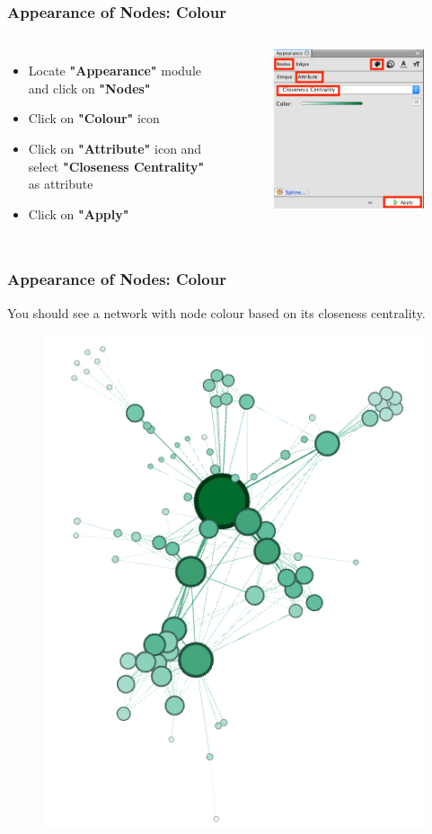 \documentclass[10pt]{beamer}
\begin{document}
\begin{frame}
\frametitle{Appearance of Nodes: Colour}

\begin{columns}[c] 
\begin{itemize}
\item Locate \textbf{"Appearance"} module and click on \textbf{"Nodes"}
\item Click on \textbf{"Colour"} icon
\item Click on \textbf{"Attribute"} icon and select \textbf{"Closeness Centrality"} as attribute
\item Click on \textbf{"Apply"}
\end{itemize}
\begin{figure}
\includegraphics[width=0.8\linewidth]{figures/node_colour.png}
\end{figure}
\end{columns}
\end{frame}

\begin{frame}
\frametitle{Appearance of Nodes: Colour}
You should see a network with node colour based on its closeness centrality.
\begin{figure}
\includegraphics[width=0.4\linewidth]{figures/network_with_node_colour.png}
\end{figure}
\end{frame}
\end{document}
